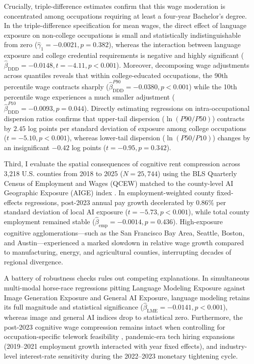 \documentclass[12pt]{article}
\begin{document}
Crucially, triple-difference estimates confirm that this wage moderation is concentrated among occupations requiring at least a four-year Bachelor's degree. In the triple-difference specification for mean wages, the direct effect of language exposure on non-college occupations is small and statistically indistinguishable from zero ($\hat{\gamma}_1 = -0.0021, p = 0.382$), whereas the interaction between language exposure and college credential requirements is negative and highly significant ($\hat{\beta}_{\text{DDD}} = -0.0148, t = -4.11, p < 0.001$). Moreover, decomposing wage adjustments across quantiles reveals that within college-educated occupations, the 90th percentile wage contracts sharply ($\hat{\beta}_{\text{DDD}}^{P90} = -0.0380, p < 0.001$) while the 10th percentile wage experiences a much smaller adjustment ($\hat{\beta}_{\text{DDD}}^{P10} = -0.0093, p = 0.044$). Directly estimating regressions on intra-occupational dispersion ratios confirms that upper-tail dispersion ($\ln(P90/P50)$) contracts by $2.45$ log points per standard deviation of exposure among college occupations ($t = -5.10, p < 0.001$), whereas lower-tail dispersion ($\ln(P50/P10)$) changes by an insignificant $-0.42$ log points ($t = -0.95, p = 0.342$).

Third, I evaluate the spatial consequences of cognitive rent compression across 3,218 U.S. counties from 2018 to 2025 ($N = 25,744$) using the BLS Quarterly Census of Employment and Wages (QCEW) matched to the county-level AI Geographic Exposure (AIGE) index \citep{felten2021}. In employment-weighted county fixed-effects regressions, post-2023 annual pay growth decelerated by $0.86\%$ per standard deviation of local AI exposure ($t = -5.73, p < 0.001$), while total county employment remained stable ($\hat{\beta}_{\text{emp}} = -0.0014, p = 0.436$). High-exposure cognitive agglomerations---such as the San Francisco Bay Area, Seattle, Boston, and Austin---experienced a marked slowdown in relative wage growth compared to manufacturing, energy, and agricultural counties, interrupting decades of regional divergence.

A battery of robustness checks rules out competing explanations. In simultaneous multi-modal horse-race regressions pitting Language Modeling Exposure against Image Generation Exposure and General AI Exposure, language modeling retains its full magnitude and statistical significance ($\hat{\beta}_{\text{LME}} = -0.0141, p < 0.001$), whereas image and general AI indices drop to statistical zero. Furthermore, the post-2023 cognitive wage compression remains intact when controlling for occupation-specific telework feasibility \citep{dingelNeiman2020}, pandemic-era tech hiring expansions (2019--2021 employment growth interacted with year fixed effects), and industry-level interest-rate sensitivity during the 2022--2023 monetary tightening cycle.
\end{document}
